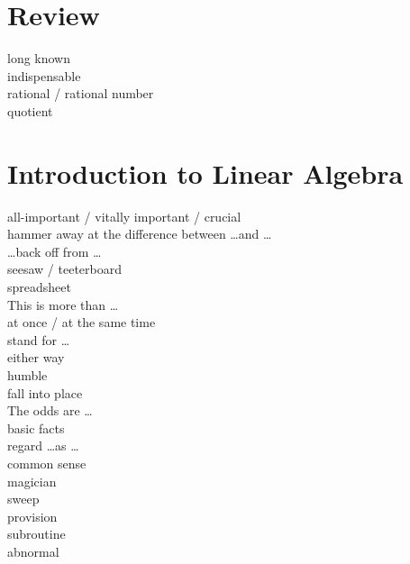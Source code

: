 \documentclass[12pt]{article}
\begin{document}
\section{Review}
long known \\
indispensable \\
rational / rational number \\
quotient \\

\section{Introduction to Linear Algebra}
all-important / vitally important / crucial \\
hammer away at the difference between \dots and \dots \\
\dots back off from \dots \\
seesaw / teeterboard \\
spreadsheet \\
This is more than \dots \\
at once / at the same time \\
stand for \dots \\
either way \\
humble \\
fall into place \\
The odds are \dots \\
basic facts \\
regard \dots as \dots \\
common sense \\
magician \\
sweep \\
provision \\
subroutine \\
abnormal \\
\end{document}
